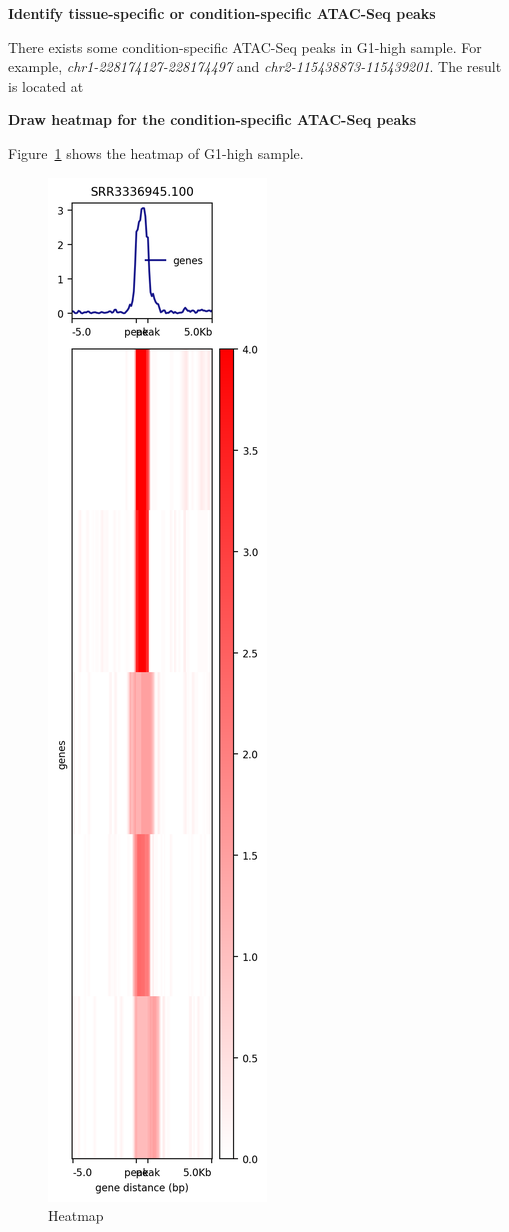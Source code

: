 \documentclass{article}
\begin{document}
\textbf{Identify tissue-specific or condition-specific ATAC-Seq peaks}


There exists some condition-specific ATAC-Seq peaks in G1-high sample.
For example, \textit{chr1-228174127-228174497} and \textit{chr2-115438873-115439201}.
The result is located at 

\textbf{Draw heatmap for the condition-specific ATAC-Seq peaks}

Figure~\ref{fig:heat} shows the heatmap of G1-high sample.

\begin{figure}
	\centering
	\includegraphics[scale = 0.8]{atac.peak.heatmap.png}
	\caption{Heatmap}
	\label{fig:heat}
\end{figure}
\end{document}
